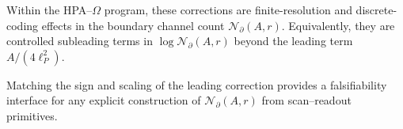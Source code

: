 Within the HPA--$\Omega$ program, these corrections are finite-resolution and discrete-coding effects in the boundary channel count $\mathcal{N}_{\partial}(A,r)$. Equivalently, they are controlled subleading terms in $\log \mathcal{N}_{\partial}(A,r)$ beyond the leading term $A/(4\ell_P^2)$.

Matching the sign and scaling of the leading correction provides a falsifiability interface for any explicit construction of $\mathcal{N}_{\partial}(A,r)$ from scan--readout primitives.
